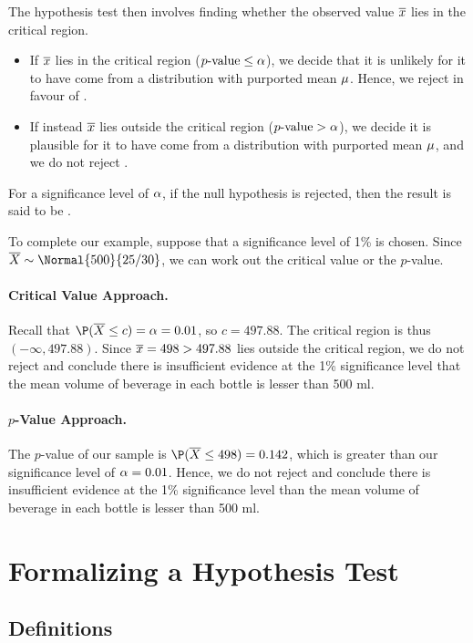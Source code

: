 The hypothesis test then involves finding whether the observed value $\overline{x}$ lies in the critical region.
\begin{itemize}
    \item If $\overline{x}$ lies in the critical region ($\text{$p$-value} \leq \alpha$), we decide that it is unlikely for it to have come from a distribution with purported mean $\mu$. Hence, we reject \nullhyp{} in favour of \althyp.
    \item If instead $\overline{x}$ lies outside the critical region ($\text{$p$-value} > \alpha$), we decide it is plausible for it to have come from a distribution with purported mean $\mu$, and we do not reject \nullhyp{}.
\end{itemize}
For a significance level of $\alpha$, if the null hypothesis \nullhyp is rejected, then the result is said to be .

To complete our example, suppose that a significance level of 1\% is chosen. Since $\ol{X} \sim \Normal{500}{25/30}$, we can work out the critical value or the $p$-value.

\paragraph{Critical Value Approach.} Recall that $\P(\ol{X} \leq c) = \a = 0.01$, so $c = 497.88$. The critical region is thus $(-\infty, 497.88)$. Since $\overline{x} = 498 > 497.88$ lies outside the critical region, we do not reject \nullhyp{} and conclude there is insufficient evidence at the 1\% significance level that the mean volume of beverage in each bottle is lesser than 500 ml.

\paragraph{$p$-Value Approach.} The $p$-value of our sample is $\P(\ol{X} \leq 498) = 0.142$, which is greater than our significance level of $\alpha = 0.01$. Hence, we do not reject \nullhyp{} and conclude there is insufficient evidence at the 1\% significance level than the mean volume of beverage in each bottle is lesser than 500 ml.

\section{Formalizing a Hypothesis Test}

\subsection{Definitions}

